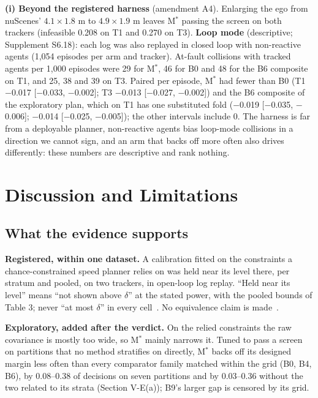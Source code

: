 \documentclass{ieeeaccess}
\begin{document}
\textbf{(i) Beyond the registered harness} (amendment A4). Enlarging the ego from nuScenes' $4.1 \times 1.8$ m to $4.9 \times 1.9$ m leaves M$^{*}$ passing the screen on both trackers (infeasible 0.208 on T1 and 0.270 on T3). \textbf{Loop mode} (descriptive; Supplement S6.18): each log was also replayed in closed loop with non-reactive agents (1,054 episodes per arm and tracker). At-fault collisions with tracked agents per 1,000 episodes were 29 for M$^{*}$, 46 for B0 and 48 for the B6 composite on T1, and 25, 38 and 39 on T3. Paired per episode, M$^{*}$ had fewer than B0 (T1 $-$0.017 [$-$0.033, $-$0.002]; T3 $-$0.013 [$-$0.027, $-$0.002]) and the B6 composite of the exploratory plan, which on T1 has one substituted fold ($-$0.019 [$-$0.035, $-$0.006]; $-$0.014 [$-$0.025, $-$0.005]); the other intervals include 0. The harness is far from a deployable planner, non-reactive agents bias loop-mode collisions in a direction we cannot sign, and an arm that backs off more often also drives differently: these numbers are descriptive and rank nothing.

\section{Discussion and Limitations}
\subsection{What the evidence supports}
\textbf{Registered, within one dataset.} A calibration fitted on the constraints a chance-constrained speed planner relies on was held near its level there, per stratum and pooled, on two trackers, in open-loop log replay. ``Held near its level'' means ``not shown above $\delta$'' at the stated power, with the pooled bounds of Table 3; never ``at most $\delta$'' in every cell~\cite{AltmanBland1995}. No equivalence claim is made~\cite{Schuirmann1987,Wellek2010}.

\textbf{Exploratory, added after the verdict.} On the relied constraints the raw covariance is mostly too wide, so M$^{*}$ mainly narrows it. Tuned to pass a screen on partitions that no method stratifies on directly, M$^{*}$ backs off its designed margin less often than every comparator family matched within the grid (B0, B4, B6), by 0.08--0.38 of decisions on seven partitions and by 0.03--0.36 without the two related to its strata (Section V-E(a)); B9's larger gap is censored by its grid.
\end{document}
